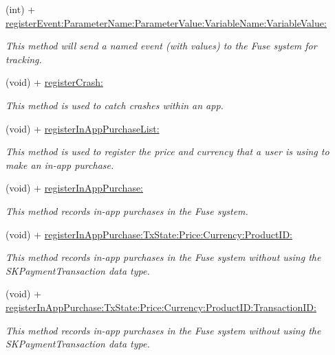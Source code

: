 \begin{DoxyCompactItemize}
(int) + \hyperlink{interface_fuse_s_d_k_a1d6a85a81319fc97ee45e597a086fe0d}{register\+Event\+:\+Parameter\+Name\+:\+Parameter\+Value\+:\+Variable\+Name\+:\+Variable\+Value\+:}
\begin{DoxyCompactList}\small\item\em This method will send a named event (with values) to the Fuse system for tracking. \end{DoxyCompactList}\item 
(void) + \hyperlink{interface_fuse_s_d_k_a9afd8c386a2b6664641da19fa64072c9}{register\+Crash\+:}
\begin{DoxyCompactList}\small\item\em This method is used to catch crashes within an app. \end{DoxyCompactList}\item 
(void) + \hyperlink{interface_fuse_s_d_k_ab1029e5beb592f22c1ba0deea9e7bd1c}{register\+In\+App\+Purchase\+List\+:}
\begin{DoxyCompactList}\small\item\em This method is used to register the price and currency that a user is using to make an in-\/app purchase. \end{DoxyCompactList}\item 
(void) + \hyperlink{interface_fuse_s_d_k_a2dd50722daab117889c396ff58fe7c27}{register\+In\+App\+Purchase\+:}
\begin{DoxyCompactList}\small\item\em This method records in-\/app purchases in the Fuse system. \end{DoxyCompactList}\item 
(void) + \hyperlink{interface_fuse_s_d_k_a8a1846c84fa16e45488e797dca4c7aaa}{register\+In\+App\+Purchase\+:\+Tx\+State\+:\+Price\+:\+Currency\+:\+Product\+I\+D\+:}
\begin{DoxyCompactList}\small\item\em This method records in-\/app purchases in the Fuse system without using the S\+K\+Payment\+Transaction data type. \end{DoxyCompactList}\item 
(void) + \hyperlink{interface_fuse_s_d_k_a2115a4fac03204fd73699ab9ea3314f5}{register\+In\+App\+Purchase\+:\+Tx\+State\+:\+Price\+:\+Currency\+:\+Product\+I\+D\+:\+Transaction\+I\+D\+:}
\begin{DoxyCompactList}\small\item\em This method records in-\/app purchases in the Fuse system without using the S\+K\+Payment\+Transaction data type. \end{DoxyCompactList}\item 

\end{DoxyCompactItemize}
